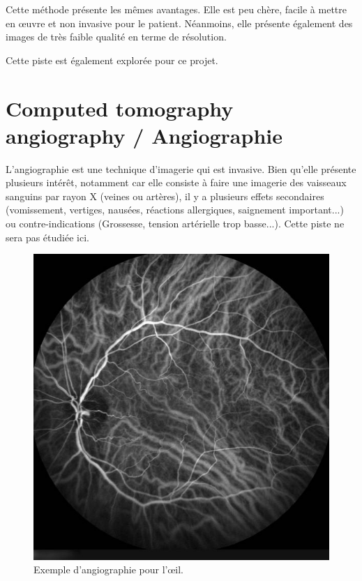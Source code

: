 Cette méthode présente les mêmes avantages. Elle est peu chère, facile à mettre en œuvre et non invasive pour le patient. Néanmoins, elle présente également des images de très faible qualité en terme de résolution.

Cette piste est également explorée pour ce projet.

\section{Computed tomography angiography / Angiographie}

L'angiographie est une technique d'imagerie qui est invasive. Bien qu'elle présente plusieurs intérêt, notamment car elle consiste à faire une imagerie des vaisseaux sanguins par rayon X (veines ou artères), il y a plusieurs effets secondaires (vomissement, vertiges, nausées, réactions allergiques, saignement important...) ou contre-indications (Grossesse, tension artérielle trop basse...). Cette piste ne sera pas étudiée ici.

\begin{figure}[H]
\centering
    \includegraphics[scale=0.5,angle=0]{Images/m_1407858437.jpg}
    \caption{Exemple d'angiographie pour l'œil.}
    \label{fig:m_1407858437}
\end{figure}

